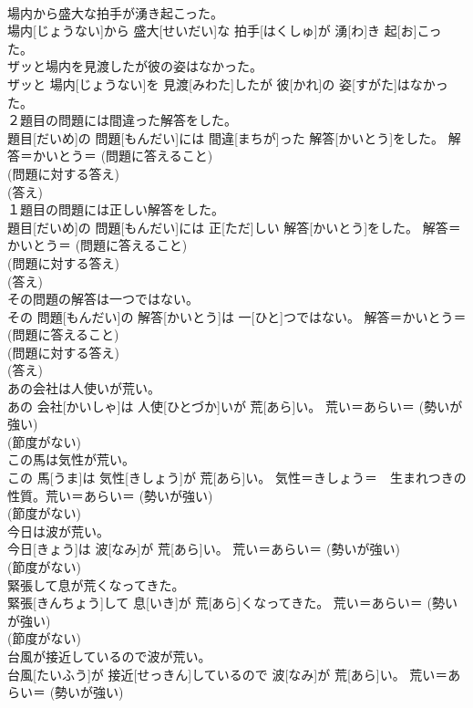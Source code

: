 \documentclass[8pt]{extreport}
\begin{document}
\begin{CJK}{UTF8}{min}
{\\	場内から盛大な拍手が湧き起こった。	
\\	場内[じょうない]から 盛大[せいだい]な 拍手[はくしゅ]が 湧[わ]き 起[お]こった。	
\\	ザッと場内を見渡したが彼の姿はなかった。	
\\	ザッと 場内[じょうない]を 見渡[みわた]したが 彼[かれ]の 姿[すがた]はなかった。	
\\	２題目の問題には間違った解答をした。	
\\	題目[だいめ]の 問題[もんだい]には 間違[まちが]った 解答[かいとう]をした。	解答＝かいとう＝ (問題に答えること) 
\\	(問題に対する答え) 
\\	(答え)
\\	１題目の問題には正しい解答をした。	
\\	題目[だいめ]の 問題[もんだい]には 正[ただ]しい 解答[かいとう]をした。	解答＝かいとう＝ (問題に答えること) 
\\	(問題に対する答え) 
\\	(答え)
\\	その問題の解答は一つではない。	
\\	その 問題[もんだい]の 解答[かいとう]は 一[ひと]つではない。	解答＝かいとう＝ (問題に答えること) 
\\	(問題に対する答え) 
\\	(答え)
\\	あの会社は人使いが荒い。	
\\	あの 会社[かいしゃ]は 人使[ひとづか]いが 荒[あら]い。	荒い＝あらい＝ (勢いが強い) 
\\	(節度がない) 
\\	この馬は気性が荒い。	
\\	この 馬[うま]は 気性[きしょう]が 荒[あら]い。	気性＝きしょう＝　生まれつきの性質。荒い＝あらい＝ (勢いが強い) 
\\	(節度がない) 
\\	今日は波が荒い。	
\\	今日[きょう]は 波[なみ]が 荒[あら]い。	荒い＝あらい＝ (勢いが強い) 
\\	(節度がない) 
\\	緊張して息が荒くなってきた。	
\\	緊張[きんちょう]して 息[いき]が 荒[あら]くなってきた。	荒い＝あらい＝ (勢いが強い) 
\\	(節度がない) 
\\	台風が接近しているので波が荒い。	
\\	台風[たいふう]が 接近[せっきん]しているので 波[なみ]が 荒[あら]い。	荒い＝あらい＝ (勢いが強い) 
}
\end{CJK}
\end{document}

